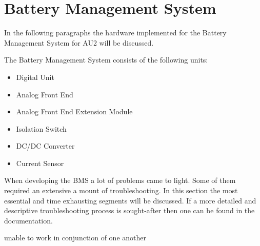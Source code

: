 \section{Battery Management System}
In the following paragraphs the hardware implemented for the Battery Management System for AU2 will be discussed. 

The Battery Management System consists of the following units:
\begin{itemize}
	\item{Digital Unit}
	\item{Analog Front End}
	\item{Analog Front End Extension Module}
	\item{Isolation Switch}
	\item{DC/DC Converter}
	\item{Current Sensor}
\end{itemize}

When developing the BMS a lot of problems came to light. Some of them required an extensive a mount of troubleshooting. In this section the most essential and time exhausting segments will be discussed. If a more detailed and descriptive troubleshooting process is sought-after then one can be found in the documentation.




unable to work in conjunction of one another